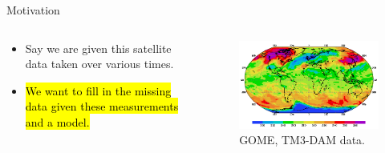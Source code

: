 \documentclass[aspectratio=169]{beamer}
\makeatletter
\let\HL\hl
\renewcommand\hl{%
  \let\set@color\beamerorig@set@color
  \let\reset@color\beamerorig@reset@color
  \HL}
\makeatother
\begin{document}
\begin{frame}{Motivation}
    \vfill
    \begin{columns}
    \begin{column}{.49\textwidth}
    \begin{itemize}
        \item Say we are given this satellite data taken over various times.
        \item \hl{We want to fill in the missing data given these measurements and a model.}
    \end{itemize}
    \end{column}

 \begin{column}{.49\textwidth}
        \begin{figure}[h]
            \centering
            \includegraphics[width=\columnwidth]{figures/gome_data_filled.png}
            \caption{GOME, TM3-DAM data.}
        \end{figure}
 \end{column}
\end{columns}
\vfill
\end{frame}

\end{document}
